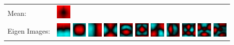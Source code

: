 \documentclass{acm_proc_article-sp}
\begin{document}
\begin{tabular}{p{1.3cm}p{6cm}}
    Mean: &\includegraphics[width=20pt]{../data/PCA_visualize/eigvec0.png} \\ 
    Eigen Images: &
        \includegraphics[width=20pt]{../data/PCA_visualize/eigvec1.png}
        \includegraphics[width=20pt]{../data/PCA_visualize/eigvec2.png}
        \includegraphics[width=20pt]{../data/PCA_visualize/eigvec3.png}
        \includegraphics[width=20pt]{../data/PCA_visualize/eigvec4.png}
        \includegraphics[width=20pt]{../data/PCA_visualize/eigvec5.png}
        \includegraphics[width=20pt]{../data/PCA_visualize/eigvec6.png}
        \includegraphics[width=20pt]{../data/PCA_visualize/eigvec7.png}
        \includegraphics[width=20pt]{../data/PCA_visualize/eigvec8.png}
        \includegraphics[width=20pt]{../data/PCA_visualize/eigvec9.png}
        \includegraphics[width=20pt]{../data/PCA_visualize/eigvec10.png}
        \includegraphics[width=20pt]{../data/PCA_visualize/eigvec11.png}

\end{tabular}
\end{document}

